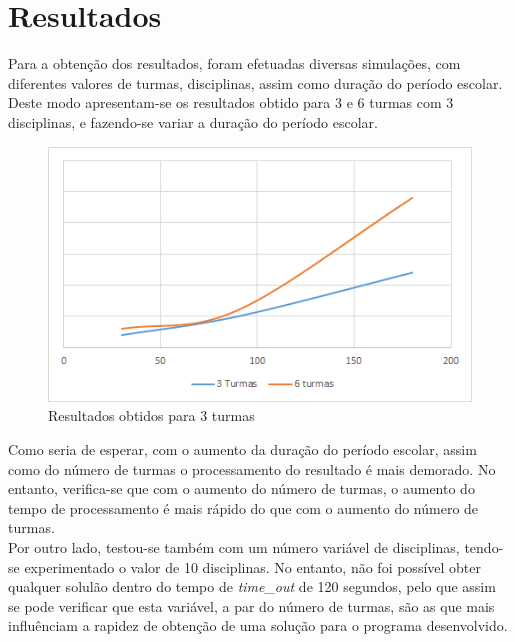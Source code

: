 \documentclass{llncs}
\begin{document}
\section{Resultados}
Para a obtenção dos resultados, foram efetuadas diversas simulações, com diferentes valores de turmas, disciplinas, assim como duração do período escolar. Deste modo apresentam-se os resultados obtido para 3 e 6 turmas com 3 disciplinas, e fazendo-se variar a duração do período escolar.

\begin{figure}
\centering
\includegraphics[scale=0.8]{grafico1.png}
\caption{Resultados obtidos para 3 turmas}
\end{figure}

Como seria de esperar, com o aumento da duração do período escolar, assim como do número de turmas o processamento do resultado é mais demorado. No entanto, verifica-se que com o aumento do número de turmas,  o aumento do tempo de processamento é mais rápido do que com o aumento do número de turmas.\\
Por outro lado, testou-se também com um número variável de disciplinas, tendo-se experimentado o valor de 10 disciplinas. No entanto, não foi possível obter qualquer solulão dentro do tempo de \textit{time\_out} de 120 segundos, pelo que assim se pode verificar que esta variável, a par do número de turmas, são as que mais influênciam a rapidez de obtenção de uma solução para o programa desenvolvido.
\end{document}
